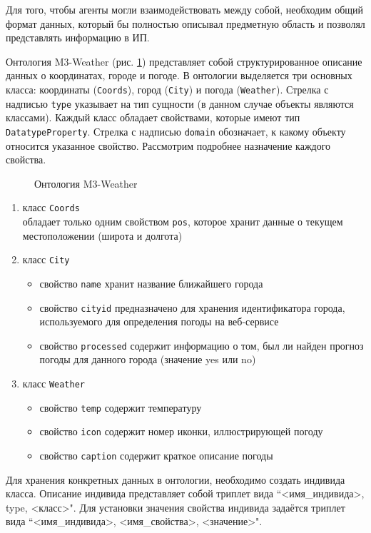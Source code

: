 Для того, чтобы агенты могли взаимодействовать между
собой, необходим общий формат данных, который бы полностью описывал предметную область
и позволял представлять информацию в ИП.

Онтология M3-Weather (рис. \ref{m3w-ontology}) представляет собой структурированное описание данных о координатах, городе и погоде. В онтологии выделяется три основных класса: координаты ({\tt Coords}), город ({\tt City}) и погода ({\tt Weather}). Стрелка с надписью {\tt type} указывает на тип сущности (в данном случае объекты являются классами). Каждый класс обладает свойствами,
которые имеют тип {\tt DatatypeProperty}. Стрелка с надписью {\tt domain} обозначает, к какому объекту относится указанное свойство. Рассмотрим подробнее назначение каждого свойства.
\begin{figure}[h]
\centerline{
}
\caption{Онтология M3-Weather}
\label{m3w-ontology}
\end{figure}

\vspace{-0.9cm}
\begin{enumerate}
\item
класс {\tt Coords}\\
обладает только одним свойством {\tt pos}, которое хранит данные о текущем местоположении (широта и долгота)
\item
класс {\tt City}
\begin{itemize}
\item
свойство {\tt name} хранит название ближайшего города
\item
свойство {\tt cityid} предназначено для хранения идентификатора города, используемого
для определения погоды на веб-сервисе
\item
свойство {\tt processed} содержит информацию о том, был ли найден прогноз погоды для данного города (значение yes или no)
\end{itemize}
\item
класс {\tt Weather}
\begin{itemize}
\item
свойство {\tt temp} содержит температуру
\item
свойство {\tt icon} содержит номер иконки, иллюстрирующей погоду
\item
свойство {\tt caption} содержит краткое описание погоды
\end{itemize}
\end{enumerate}

Для хранения конкретных данных в онтологии, необходимо создать индивида класса.
Описание индивида представляет собой триплет вида ``<имя\_индивида>, type, <класс>".
Для установки значения свойства индивида задаётся триплет вида
``<имя\_индивида>, <имя\_свойства>, <значение>".

